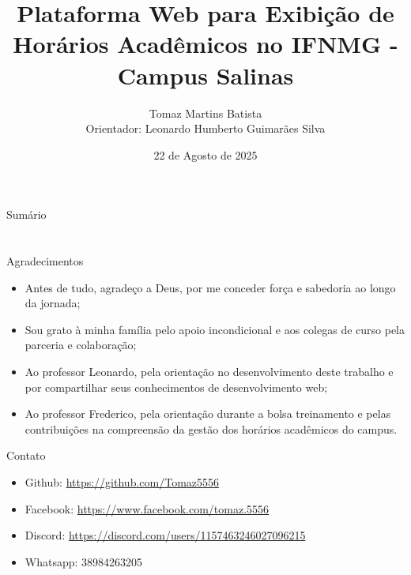 \documentclass[handout,t]{beamer}
\title[Trabalho de Conclusão de Curso]{
	Plataforma Web para Exibição de Horários Acadêmicos no IFNMG - Campus Salinas}
\date{
	22 de Agosto de 2025}
\author[Autor: Tomaz Martins Batista]{
	Tomaz Martins Batista\\
	Orientador: Leonardo Humberto Guimarães Silva\\
	\vspace{0.5cm}}
\institute[]{
	Bacharelado em Sistemas de informação\\
	Instituto Federal do Norte de Minas Gerais - Campus Salinas\\
	\vspace{0.5cm}}
\begin{document}
\frame{\titlepage}
\section[]{}
\begin{frame}{Sumário}
	\tableofcontents
\end{frame}













%

\section{}
\begin{frame}{Agradecimentos}
	\begin{itemize}
		\item Antes de tudo, agradeço a Deus, por me conceder força e sabedoria ao longo da jornada; \vspace{0.5cm}
		\item Sou grato à minha família pelo apoio incondicional e aos colegas de curso pela parceria e colaboração; \vspace{0.5cm}
		\item Ao professor Leonardo, pela orientação no desenvolvimento deste trabalho e por compartilhar seus conhecimentos de desenvolvimento web; \vspace{0.5cm}
		\item Ao professor Frederico, pela orientação durante a bolsa treinamento e pelas contribuições na compreensão da gestão dos horários acadêmicos do campus. \vspace{0.5cm}
	\end{itemize}
\end{frame}

\begin{frame}{Contato}
	\begin{itemize}
		\item Github: \url{https://github.com/Tomaz5556} \vspace{0.5cm}
		\item Facebook: \url{https://www.facebook.com/tomaz.5556} \vspace{0.5cm}
		\item Discord: \url{https://discord.com/users/1157463246027096215} \vspace{0.5cm}
		\item Whatsapp: 38984263205 \vspace{0.5cm}
	\end{itemize}
\end{frame}
\end{document}
